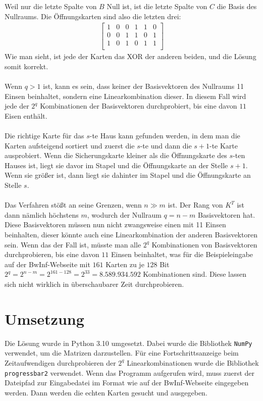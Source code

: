 \documentclass[a4paper,10pt,ngerman]{scrartcl}
\begin{document}
Weil nur die letzte Spalte von $B$ Null ist, ist die letzte Spalte von $C$ die Basis des Nullraums. Die Öffnungskarten sind also die letzten drei:
\begin{align*}
\left[\begin{array}{cccccc}
1 & 0 & 0 & 1 & 1 & 0 \\
0 & 0 & 1 & 1 & 0 & 1 \\
1 & 0 & 1 & 0 & 1 & 1 \\
\end{array}\right]
\end{align*}
Wie man sieht, ist jede der Karten das XOR der anderen beiden, und die Lösung somit korrekt. \\\\
Wenn $q>1$ ist, kann es sein, dass keiner der Basisvektoren des Nullraums 11 Einsen beinhaltet, sondern eine Linearkombination dieser. In diesem Fall wird jede der $2^q$ Kombinationen der Basisvektoren durchprobiert, bis eine davon $11$ Eisen enthält.\\\\
Die richtige Karte für das $s$-te Haus kann gefunden werden, in dem man die Karten aufsteigend sortiert und zuerst die $s$-te und dann die $s+1$-te Karte ausprobiert. Wenn die Sicherungskarte kleiner als die Öffnungskarte des $s$-ten Hauses ist, liegt sie davor im Stapel und die Öffnungskarte an der Stelle $s+1$. Wenn sie größer ist, dann liegt sie dahinter im Stapel und die Öffnungskarte an Stelle $s$.\\
\\
Das Verfahren stößt an seine Grenzen, wenn $n \gg m$ ist. Der Rang von $K^T$ ist dann nämlich höchstens $m$, wodurch der Nullraum $q=n-m$ Basisvektoren hat. Diese Basisvektoren müssen nun nicht zwangsweise einen mit 11 Einsen beinhalten, dieser könnte auch eine Linearkombination der anderen Basisvektoren sein. Wenn das der Fall ist, müsste man alle $2^q$ Kombinationen von Basisvektoren durchprobieren, bis eine davon $11$ Einsen beinhaltet, was für die Beispieleingabe auf der BwInf-Webseite mit $161$ Karten zu je $128$ Bit $2^q=2^{n-m}=2^{161-128}=2^{33}=8.589.934.592$ Kombinationen sind. Diese lassen sich nicht wirklich in überschaubarer Zeit durchprobieren.
\section{Umsetzung}
Die Lösung wurde in Python 3.10 umgesetzt. Dabei wurde die Bibliothek \lstinline|NumPy| verwendet, um die Matrizen darzustellen. Für eine Fortschrittsanzeige beim Zeitaufwendigen durchprobieren der $2^q$ Linearkombinationen wurde die Bibliothek \lstinline|progressbar2| verwendet. Wenn das Programm aufgerufen wird, muss zuerst der Dateipfad zur Eingabedatei im Format wie auf der BwInf-Webseite eingegeben werden. Dann werden die echten Karten gesucht und ausgegeben.
\end{document}

